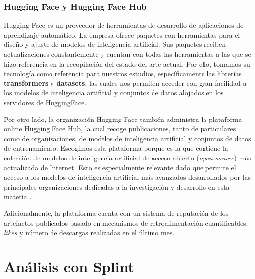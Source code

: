 \documentclass[12pt, a4paper, twoside]{article}
\begin{document}
\subsubsection{Hugging Face y Hugging Face Hub}
Hugging Face es un proveedor de herramientas de desarrollo de aplicaciones de aprendizaje automático. La empresa ofrece paquetes con herramientas para el diseño y ajuste de modelos de inteligencia artificial. Sus paquetes reciben actualizaciones constantemente y cuentan con todas las herramientas a las que se hizo referencia en la recopilación del estado del arte actual. Por ello, tomamos su tecnología como referencia para nuestros estudios, específicamente las librerías \textbf{transformers} y \textbf{datasets}, las cuales nos permiten acceder con gran facilidad a los modelos de inteligencia artificial y conjuntos de datos alojados en los servidores de HuggingFace. 

Por otro lado, la organización Hugging Face también administra la plataforma online Hugging Face Hub, la cual recoge publicaciones, tanto de particulares como de organizaciones, de modelos de inteligencia artificial y conjuntos de datos de entrenamiento. Escogimos esta plataforma porque es la que contiene la colección de modelos de inteligencia artificial de acceso abierto (\textit{open source}) más actualizada de Internet. Esto es especialmente relevante dado que permite el acceso a los modelos de inteligencia artificial más avanzados desarrollados por las principales organizaciones dedicadas a la investigación y desarrollo en esta materia \cite{hugging-face}.

Adicionalmente, la plataforma cuenta con un sistema de reputación de los artefactos publicados basado en mecanismos de retroalimentación cuantificables:  \textit{likes} y número de descargas realizadas en el último mes.


\section{Análisis con Splint}
\end{document}
